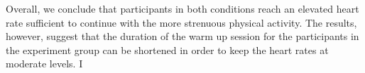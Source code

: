 Overall, we conclude that  participants in both conditions reach an elevated heart rate sufficient to continue with the more strenuous physical activity. The results, however, suggest that the duration  of the warm up session for the participants in the experiment group can be shortened in order to keep the heart rates at moderate levels. 
I%

